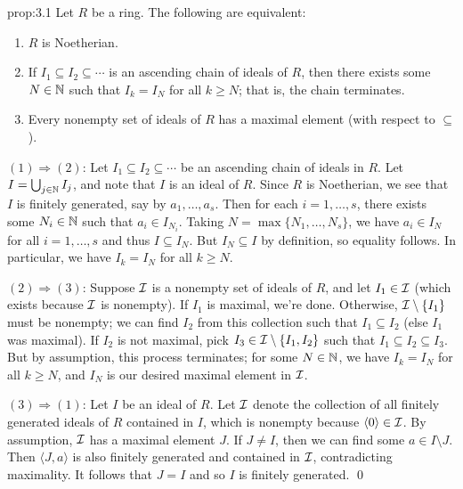 \begin{prop}{prop:3.1}
    Let $R$ be a ring. The following are equivalent:
    \begin{enumerate}[(1)]
        \item $R$ is Noetherian. 
        \item If $I_1 \subseteq I_2 \subseteq \cdots$ is an ascending 
        chain of ideals of $R$, then there exists some $N \in \mathbb{N}$ such that 
        $I_k = I_N$ for all $k \geq N$; that is, the chain terminates.
        \item Every nonempty set of ideals of $R$ has a maximal element 
        (with respect to $\subseteq$). 
    \end{enumerate}
\end{prop}\vspace{-0.25cm}
\begin{pf}
    $(1) \Rightarrow (2)$: Let $I_1 \subseteq I_2 \subseteq \cdots$ be 
    an ascending chain of ideals in $R$. Let $I = \bigcup_{j\in\mathbb{N}} I_j$, 
    and note that $I$ is an ideal of $R$. Since $R$ is Noetherian, 
    we see that $I$ is finitely generated, say by $a_1, \dots, a_s$. 
    Then for each $i = 1, \dots, s$, there exists some $N_i \in \mathbb{N}$ such that 
    $a_i \in I_{N_i}$. Taking $N = \max\{N_1, \dots, N_s\}$, we have 
    $a_i \in I_N$ for all $i = 1, \dots, s$ and thus $I \subseteq I_N$. 
    But $I_N \subseteq I$ by definition, so equality follows. In particular, 
    we have $I_k = I_N$ for all $k \geq N$. 
    
    $(2) \Rightarrow (3)$: Suppose ${\cal I}$ is a nonempty set of ideals of 
    $R$, and let $I_1 \in {\cal I}$ (which exists because ${\cal I}$ is 
    nonempty). If $I_1$ is maximal, we're done. Otherwise, ${\cal I} \setminus 
    \{I_1\}$ must be nonempty; we can find $I_2$ from this collection 
    such that $I_1 \subseteq I_2$ (else $I_1$ was maximal). If 
    $I_2$ is not maximal, pick $I_3 \in {\cal I} \setminus \{I_1, I_2\}$ 
    such that $I_1 \subseteq I_2 \subseteq I_3$. But by assumption, this 
    process terminates; for some $N \in \mathbb{N}$, we have $I_k = I_N$ 
    for all $k \geq N$, and $I_N$ is our desired maximal element in ${\cal I}$.

    $(3) \Rightarrow (1)$: Let $I$ be an ideal of $R$. Let ${\cal I}$ 
    denote the collection of all finitely generated ideals of $R$ 
    contained in $I$, which is nonempty because $\langle 0 \rangle 
    \in {\cal I}$. By assumption, ${\cal I}$ has a maximal element $J$. 
    If $J \neq I$, then we can find some $a \in I \setminus J$. Then 
    $\langle J, a \rangle$ is also finitely generated and contained in 
    ${\cal I}$, contradicting maximality. It follows that $J = I$ 
    and so $I$ is finitely generated. \qed 
\end{pf}\vspace{-0.25cm}

